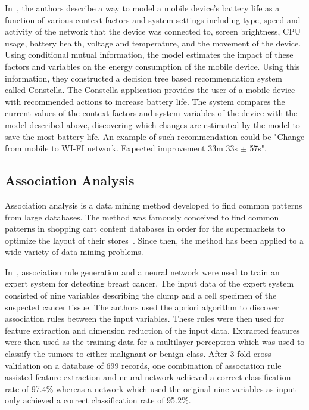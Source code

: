 In~\cite{PELTONEN201671}, the authors describe a way to model a mobile device's battery life as a function of various context factors and system settings including type, speed and activity of the network that the device was connected to, screen brightness, CPU usage, battery health, voltage and temperature, and the movement of the device. Using conditional mutual information, the model estimates the impact of these factors and variables on the energy consumption of the mobile device. Using this information, they constructed a decision tree based recommendation system called Constella. The Constella application provides the user of a mobile device with recommended actions to increase battery life. The system compares the current values of the context factors and system variables of the device with the model described above, discovering which changes are estimated by the model to save the most battery life. An example of such recommendation could be "Change from mobile to WI-FI network. Expected improvement 33m 33s $\pm$ 57s".    

    


\subsection{Association Analysis}

Association analysis is a data mining method developed to find common patterns from large databases. The method was famously conceived to find common patterns in shopping cart content databases in order for the supermarkets to optimize the layout of their stores~\cite{Agrawal:1993:MAR:170036.170072}. Since then, the method has been applied to a wide variety of data mining problems.

In~\cite{KARABATAK20093465}, association rule generation and a neural network were used to train an expert system for detecting breast cancer. The input data of the expert system consisted of nine variables describing the clump and a cell specimen of the suspected cancer tissue. The authors used the apriori algorithm to discover association rules between the input variables. These rules were then used for feature extraction and dimension reduction of the input data. Extracted features were then used as the training data for a multilayer perceptron which was used to classify the tumors to either malignant or benign class. After 3-fold cross validation on a database of 699 records, one combination of association rule assisted feature extraction and neural network achieved a correct classification rate of 97.4\% whereas a network which used the original nine variables as input only achieved a correct classification rate of 95.2\%.

